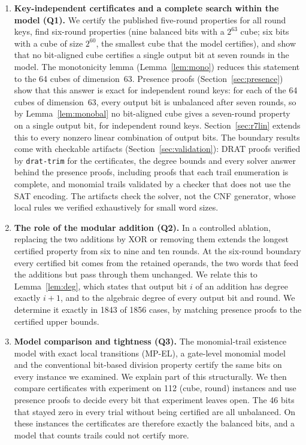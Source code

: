 \documentclass[pdflatex,sn-mathphys-num]{sn-jnl}
\theoremstyle{thmstyleone}
\theoremstyle{thmstylethree}
\theoremstyle{thmstyletwo}
\newcommand{\MPEL}{\textsf{MP-EL}}
\begin{document}
\begin{enumerate}
\item \textbf{Key-independent certificates and a complete search within the model (Q1).} We certify the published five-round properties for all round keys, find six-round properties (nine balanced bits with a $2^{63}$ cube; six bits with a cube of size $2^{60}$, the smallest cube that the model certifies), and show that no bit-aligned cube certifies a single output bit at seven rounds in the model. The monotonicity lemma (Lemma~\ref{lem:mono}) reduces this statement to the 64 cubes of dimension~63. Presence proofs (Section~\ref{sec:presence}) show that this answer is exact for independent round keys: for each of the 64 cubes of dimension~63, every output bit is unbalanced after seven rounds, so by Lemma~\ref{lem:monobal} no bit-aligned cube gives a seven-round property on a single output bit, for independent round keys. Section~\ref{sec:r7lin} extends this to every nonzero linear combination of output bits. The boundary results come with checkable artifacts (Section~\ref{sec:validation}): DRAT proofs verified by \texttt{drat-trim} for the certificates, the degree bounds and every solver answer behind the presence proofs, including proofs that each trail enumeration is complete, and monomial trails validated by a checker that does not use the SAT encoding. The artifacts check the solver, not the CNF generator, whose local rules we verified exhaustively for small word sizes.
\item \textbf{The role of the modular addition (Q2).} In a controlled ablation, replacing the two additions by XOR or removing them extends the longest certified property from six to nine and ten rounds. At the six-round boundary every certified bit comes from the retained operands, the two words that feed the additions but pass through them unchanged. We relate this to Lemma~\ref{lem:deg}, which states that output bit $i$ of an addition has degree exactly $i+1$, and to the algebraic degree of every output bit and round. We determine it exactly in 1843 of 1856 cases, by matching presence proofs to the certified upper bounds.
\item \textbf{Model comparison and tightness (Q3).} The monomial-trail existence model with exact local transitions (\MPEL), a gate-level monomial model and the conventional bit-based division property certify the same bits on every instance we examined. We explain part of this structurally. We then compare certificates with experiment on 112 (cube, round) instances and use presence proofs to decide every bit that experiment leaves open. The 46 bits that stayed zero in every trial without being certified are all unbalanced. On these instances the certificates are therefore exactly the balanced bits, and a model that counts trails could not certify more.
\end{enumerate}
\end{document}
